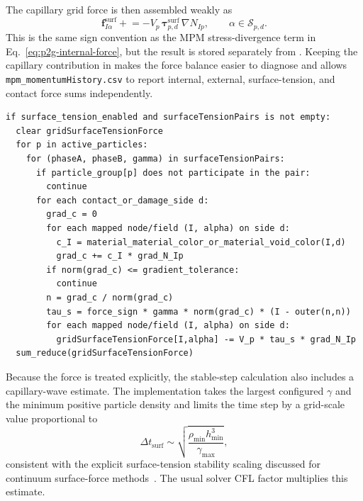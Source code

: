 The capillary grid force is then assembled weakly as
\begin{equation}
  \mathbf{f}^{\mathrm{surf}}_{I\alpha}
  \mathrel{+}= -V_p\,\boldsymbol{\tau}^{\mathrm{surf}}_{p,d}\,\nabla N_{Ip},
  \qquad \alpha\in\mathcal{S}_{p,d}.
  \label{eq:mpm-surface-tension-force}
\end{equation}
This is the same sign convention as the MPM stress-divergence term in Eq.~\eqref{eq:p2g-internal-force}, but the result is stored separately from .  Keeping the capillary contribution in  makes the force balance easier to diagnose and allows \texttt{mpm\_momentumHistory.csv} to report internal, external, surface-tension, and contact force sums independently.

\begin{lstlisting}[caption={Surface-tension force assembly.},basicstyle=\ttfamily\small]
if surface_tension_enabled and surfaceTensionPairs is not empty:
  clear gridSurfaceTensionForce
  for p in active_particles:
    for (phaseA, phaseB, gamma) in surfaceTensionPairs:
      if particle_group[p] does not participate in the pair:
        continue
      for each contact_or_damage_side d:
        grad_c = 0
        for each mapped node/field (I, alpha) on side d:
          c_I = material_material_color_or_material_void_color(I,d)
          grad_c += c_I * grad_N_Ip
        if norm(grad_c) <= gradient_tolerance:
          continue
        n = grad_c / norm(grad_c)
        tau_s = force_sign * gamma * norm(grad_c) * (I - outer(n,n))
        for each mapped node/field (I, alpha) on side d:
          gridSurfaceTensionForce[I,alpha] -= V_p * tau_s * grad_N_Ip
  sum_reduce(gridSurfaceTensionForce)
\end{lstlisting}

Because the force is treated explicitly, the stable-step calculation also includes a capillary-wave estimate.  The implementation takes the largest configured $\gamma$ and the minimum positive particle density and limits the time step by a grid-scale value proportional to
\begin{equation}
  \Delta t_{\mathrm{surf}}
  \sim \sqrt{\frac{\rho_{\min} h_{\min}^{3}}{\gamma_{\max}}},
\end{equation}
consistent with the explicit surface-tension stability scaling discussed for continuum surface-force methods~\cite{brackbill1992csf}.  The usual solver CFL factor multiplies this estimate.

